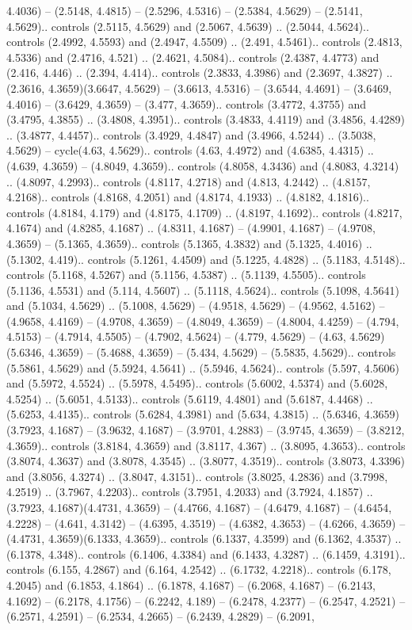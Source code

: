 4.4036) -- (2.5148, 4.4815) -- (2.5296, 4.5316) -- (2.5384, 4.5629) -- (2.5141, 4.5629).. controls (2.5115, 4.5629) and (2.5067, 4.5639) .. (2.5044, 4.5624).. controls (2.4992, 4.5593) and (2.4947, 4.5509) .. (2.491, 4.5461).. controls (2.4813, 4.5336) and (2.4716, 4.521) .. (2.4621, 4.5084).. controls (2.4387, 4.4773) and (2.416, 4.446) .. (2.394, 4.414).. controls (2.3833, 4.3986) and (2.3697, 4.3827) .. (2.3616, 4.3659)(3.6647, 4.5629) -- (3.6613, 4.5316) -- (3.6544, 4.4691) -- (3.6469, 4.4016) -- (3.6429, 4.3659) -- (3.477, 4.3659).. controls (3.4772, 4.3755) and (3.4795, 4.3855) .. (3.4808, 4.3951).. controls (3.4833, 4.4119) and (3.4856, 4.4289) .. (3.4877, 4.4457).. controls (3.4929, 4.4847) and (3.4966, 4.5244) .. (3.5038, 4.5629) -- cycle(4.63, 4.5629).. controls (4.63, 4.4972) and (4.6385, 4.4315) .. (4.639, 4.3659) -- (4.8049, 4.3659).. controls (4.8058, 4.3436) and (4.8083, 4.3214) .. (4.8097, 4.2993).. controls (4.8117, 4.2718) and (4.813, 4.2442) .. (4.8157, 4.2168).. controls (4.8168, 4.2051) and (4.8174, 4.1933) .. (4.8182, 4.1816).. controls (4.8184, 4.179) and (4.8175, 4.1709) .. (4.8197, 4.1692).. controls (4.8217, 4.1674) and (4.8285, 4.1687) .. (4.8311, 4.1687) -- (4.9901, 4.1687) -- (4.9708, 4.3659) -- (5.1365, 4.3659).. controls (5.1365, 4.3832) and (5.1325, 4.4016) .. (5.1302, 4.419).. controls (5.1261, 4.4509) and (5.1225, 4.4828) .. (5.1183, 4.5148).. controls (5.1168, 4.5267) and (5.1156, 4.5387) .. (5.1139, 4.5505).. controls (5.1136, 4.5531) and (5.114, 4.5607) .. (5.1118, 4.5624).. controls (5.1098, 4.5641) and (5.1034, 4.5629) .. (5.1008, 4.5629) -- (4.9518, 4.5629) -- (4.9562, 4.5162) -- (4.9658, 4.4169) -- (4.9708, 4.3659) -- (4.8049, 4.3659) -- (4.8004, 4.4259) -- (4.794, 4.5153) -- (4.7914, 4.5505) -- (4.7902, 4.5624) -- (4.779, 4.5629) -- (4.63, 4.5629)(5.6346, 4.3659) -- (5.4688, 4.3659) -- (5.434, 4.5629) -- (5.5835, 4.5629).. controls (5.5861, 4.5629) and (5.5924, 4.5641) .. (5.5946, 4.5624).. controls (5.597, 4.5606) and (5.5972, 4.5524) .. (5.5978, 4.5495).. controls (5.6002, 4.5374) and (5.6028, 4.5254) .. (5.6051, 4.5133).. controls (5.6119, 4.4801) and (5.6187, 4.4468) .. (5.6253, 4.4135).. controls (5.6284, 4.3981) and (5.634, 4.3815) .. (5.6346, 4.3659)(3.7923, 4.1687) -- (3.9632, 4.1687) -- (3.9701, 4.2883) -- (3.9745, 4.3659) -- (3.8212, 4.3659).. controls (3.8184, 4.3659) and (3.8117, 4.367) .. (3.8095, 4.3653).. controls (3.8074, 4.3637) and (3.8078, 4.3545) .. (3.8077, 4.3519).. controls (3.8073, 4.3396) and (3.8056, 4.3274) .. (3.8047, 4.3151).. controls (3.8025, 4.2836) and (3.7998, 4.2519) .. (3.7967, 4.2203).. controls (3.7951, 4.2033) and (3.7924, 4.1857) .. (3.7923, 4.1687)(4.4731, 4.3659) -- (4.4766, 4.1687) -- (4.6479, 4.1687) -- (4.6454, 4.2228) -- (4.641, 4.3142) -- (4.6395, 4.3519) -- (4.6382, 4.3653) -- (4.6266, 4.3659) -- (4.4731, 4.3659)(6.1333, 4.3659).. controls (6.1337, 4.3599) and (6.1362, 4.3537) .. (6.1378, 4.348).. controls (6.1406, 4.3384) and (6.1433, 4.3287) .. (6.1459, 4.3191).. controls (6.155, 4.2867) and (6.164, 4.2542) .. (6.1732, 4.2218).. controls (6.178, 4.2045) and (6.1853, 4.1864) .. (6.1878, 4.1687) -- (6.2068, 4.1687) -- (6.2143, 4.1692) -- (6.2178, 4.1756) -- (6.2242, 4.189) -- (6.2478, 4.2377) -- (6.2547, 4.2521) -- (6.2571, 4.2591) -- (6.2534, 4.2665) -- (6.2439, 4.2829) -- (6.2091, 